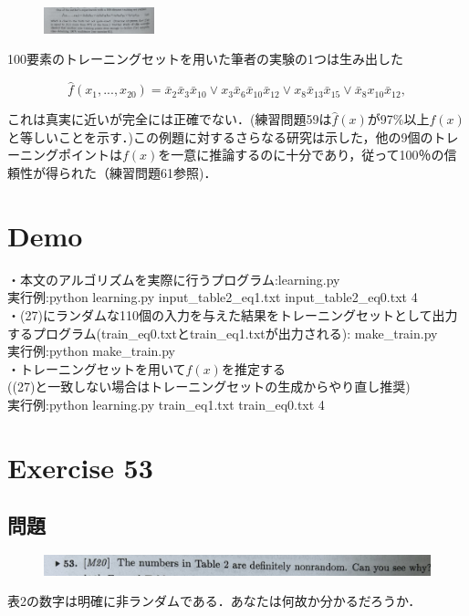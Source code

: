 \documentclass[dvipdfmx,a4paper,12pt]{jsarticle}
\begin{document}
\newpage

 \begin{figure}[htbp]
  \centering
  \includegraphics[width=32mm,angle=270]{images/3-6.jpg}
  \end{figure}
  100要素のトレーニングセットを用いた筆者の実験の1つは生み出した
  
  \begin{equation}
\hat{f}(x_{1},...,x_{20}) = \bar{x}_{2}\bar{x}_{3}\bar{x}_{10} \lor x_{3}\bar{x}_{6}\bar{x}_{10}\bar{x}_{12} \lor x_{8}\bar{x}_{13}\bar{x}_{15} \lor \bar{x}_{8}x_{10}\bar{x}_{12}, 
\end{equation}  
  
これは真実に近いが完全には正確でない．(練習問題59は$\hat{f}(x)$が97\%以上$f(x)$と等しいことを示す．)この例題に対するさらなる研究は示した，他の9個のトレーニングポイントは$f(x)$を一意に推論するのに十分であり，従って100％の信頼性が得られた（練習問題61参照)．\\


\section*{Demo}
・本文のアルゴリズムを実際に行うプログラム:learning.py \\
実行例:python learning.py input\_table2\_eq1.txt input\_table2\_eq0.txt 4 \\

・(27)にランダムな110個の入力を与えた結果をトレーニングセットとして出力するプログラム(train\_eq0.txtとtrain\_eq1.txtが出力される): make\_train.py\\
実行例:python make\_train.py  \\

・トレーニングセットを用いて$f(x)$を推定する\\((27)と一致しない場合はトレーニングセットの生成からやり直し推奨)\\
実行例:python learning.py train\_eq1.txt train\_eq0.txt  4

\newpage


\section*{Exercise 53}
\subsection*{問題}
 \begin{figure}[htbp]
  \centering
  \includegraphics[width=142mm,angle=0]{images/51.jpg}
  \end{figure}
 表2の数字は明確に非ランダムである．あなたは何故か分かるだろうか．
\end{document}
